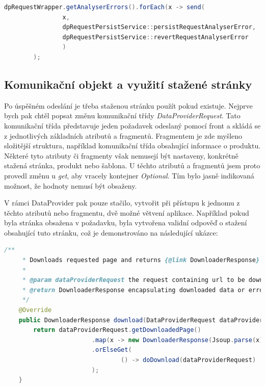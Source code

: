 \documentclass[thesis=B,czech]{FITthesis}[2012/06/26]
\begin{document}
\begin{lstlisting}[language=Java, caption={Volání metody, která odesílá požadavky}]
        dpRequestWrapper.getAnalyserErrors().forEach(x -> send(
                x,
                dpRequestPersistService::persistRequestAnalyserError,
                dpRequestPersistService::revertRequestAnalyserError
                )
        );
\end{lstlisting}

\subsection{Komunikační objekt a využití stažené stránky}
Po úspěšném odeslání je třeba staženou stránku použít pokud existuje. Nejprve bych pak chtěl popsat změnu komunikační třídy \textit{DataProviderRequest}.
Tato komunikační třída představuje jeden požadavek odeslaný pomocí front a skládá se z jednotlivých základních atributů a fragmentů.
Fragmentem je zde myšleno složitější struktura, například komunikační třída obsahující informace o produktu. Některé tyto atributy
či fragmenty však nemusejí být nastaveny, konkrétně stažená stránka, produkt nebo šablona. U těchto atributů a fragmentů jsem proto provedl změnu u \textit{get}, aby vracely kontejner \textit{Optional}. Tím bylo jasně indikovaná možnost, že hodnoty nemusí být obsaženy.
\par
V rámci DataProvider pak pouze stačilo, vytvořit při přístupu k jednomu z těchto atributů nebo fragmentu, dvě možné větvení aplikace.
Například pokud byla stránka obsažena v požadavku, byla vytvořena validní odpověď o stažení obsahující tuto stránku, což je demonstrováno na 
následující ukázce:
\begin{lstlisting}[language=Java, caption={Veřejná metoda třídy \textit{DPDownloaderServiceImpl} zajišťující stažení detailu produktu}]
    /**
     * Downloads requested page and returns {@link DownloaderResponse} object.
     *
     * @param dataProviderRequest the request containing url to be downloaded
     * @return DownloaderResponse encapsulating downloaded data or error
     */
    @Override
    public DownloaderResponse download(DataProviderRequest dataProviderRequest) {
        return dataProviderRequest.getDownloadedPage()
                        .map(x -> new DownloaderResponse(Jsoup.parse(x)))
                        .orElseGet(
                                () -> doDownload(dataProviderRequest)
                        );
    }
\end{lstlisting}
\end{document}
